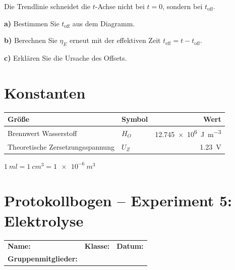\documentclass[11pt,a4paper]{scrartcl}
\begin{document}
	\begin{sternaufgabe}[title={\faIcon{star} Aufgabe 4: Offset-Korrektur}]
		Die Trendlinie schneidet die $t$-Achse nicht bei $t=0$, sondern bei $t_{\text{off}}$.
		
		\textbf{a)} Bestimmen Sie $t_{\text{off}}$ aus dem Diagramm.
		
		\textbf{b)} Berechnen Sie $\eta_E$ erneut mit der effektiven Zeit $t_{\text{eff}} = t - t_{\text{off}}$.
		
		\textbf{c)} Erklären Sie die Ursache des Offsets.
	\end{sternaufgabe}
	
	\section*{Konstanten}
	
	\begin{center}
		\renewcommand{\arraystretch}{1.3}
		\begin{tabular}{llr}
			\toprule
			\textbf{Größe} & \textbf{Symbol} & \textbf{Wert} \\
			\midrule
			Brennwert Wasserstoff & $H_O$ & \SI{12,745e6}{\joule\per\cubic\metre} \\
			Theoretische Zersetzungsspannung & $U_Z$ & \SI{1,23}{\volt} \\
			\bottomrule
		\end{tabular}
	\end{center}
	
	\begin{hilfebox}[title={\faIcon{lightbulb} Umrechnung Volumen}]
		$\SI{1}{ml} = \SI{1}{cm^3} = \SI{1e-6}{m^3}$
	\end{hilfebox}
	
	\newpage
	\section*{Protokollbogen -- Experiment 5: Elektrolyse}
	
	\begin{center}
		\begin{tcolorbox}[colback=white, colframe=black, width=\textwidth, boxrule=0.5pt]
			\begin{tabular}{@{}p{0.32\textwidth}p{}p{}@{}}
				\textbf{Name:} \hrulefill & \textbf{Klasse:} \hrulefill & \textbf{Datum:} \hrulefill \\[0.4cm]
				\textbf{Gruppenmitglieder:} & \multicolumn{2}{l}{\hrulefill} \\
			\end{tabular}
		\end{tcolorbox}
	\end{center}
	
\end{document}
